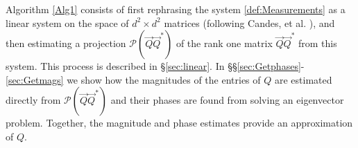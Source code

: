 \documentclass[]{spie}  %
\def \vec{\overrightarrow}
\begin{document}
Algorithm \ref{Alg1} consists of first rephrasing the system \eqref{def:Measurements} as a linear system on the space of $d^2 \times d^2$ matrices (following Candes, et al. \cite{candes2013phaselift}), and then estimating a projection $\mathcal{P}( \vec{Q}\vec{Q}^*)$ of the rank one matrix $\vec{Q}\vec{Q}^*$ from this system.  This process is described in \S\ref{sec:linear}.  In \S\S\ref{sec:Getphases}-\ref{sec:Getmags} we show how the magnitudes of the entries of $Q$ are estimated directly from $\mathcal{P}(\vec{Q}\vec{Q}^*)$ and their phases are found from solving an eigenvector problem.  Together, the magnitude and phase estimates provide an approximation of $Q$.

\end{document}
